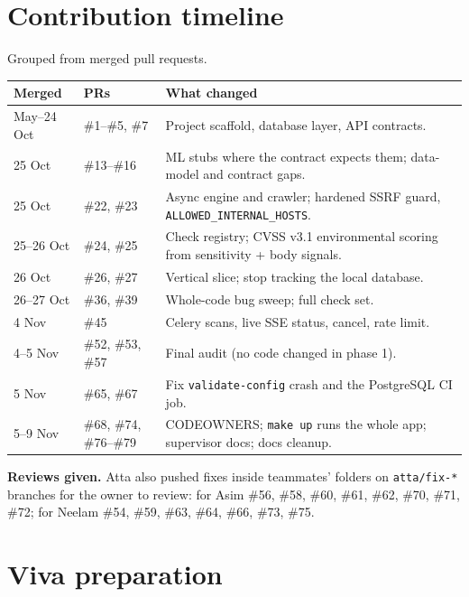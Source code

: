 \section{Contribution timeline}
Grouped from merged pull requests.
\begin{center}\small
\begin{tabularx}{\linewidth}{@{}llX@{}}
\toprule
Merged & PRs & What changed\\
\midrule
May--24 Oct & \#1--\#5, \#7 & Project scaffold, database layer, API contracts.\\
25 Oct & \#13--\#16 & ML stubs where the contract expects them; data-model and contract gaps.\\
25 Oct & \#22, \#23 & Async engine and crawler; hardened SSRF guard, \texttt{ALLOWED\_INTERNAL\_HOSTS}.\\
25--26 Oct & \#24, \#25 & Check registry; CVSS v3.1 environmental scoring from sensitivity + body signals.\\
26 Oct & \#26, \#27 & Vertical slice; stop tracking the local database.\\
26--27 Oct & \#36, \#39 & Whole-code bug sweep; full check set.\\
4 Nov & \#45 & Celery scans, live SSE status, cancel, rate limit.\\
4--5 Nov & \#52, \#53, \#57 & Final audit (no code changed in phase 1).\\
5 Nov & \#65, \#67 & Fix \texttt{validate-config} crash and the PostgreSQL CI job.\\
5--9 Nov & \#68, \#74, \#76--\#79 & CODEOWNERS; \texttt{make up} runs the whole app; supervisor docs; docs cleanup.\\
\bottomrule
\end{tabularx}
\end{center}
\textbf{Reviews given.} Atta also pushed fixes inside teammates' folders on
\texttt{atta/fix-*} branches for the owner to review: for Asim \#56, \#58, \#60,
\#61, \#62, \#70, \#71, \#72; for Neelam \#54, \#59, \#63, \#64, \#66, \#73, \#75.

\section{Viva preparation}
